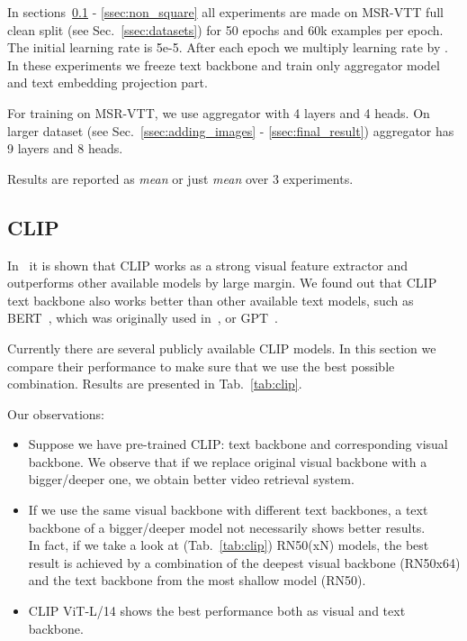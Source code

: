 In sections~\ref{ssec:clip} - \ref{ssec:non_square} all experiments are made on MSR-VTT full clean split (see Sec.~\ref{ssec:datasets}) for 50 epochs and 60k examples per epoch. The initial learning rate is 5e-5. After each epoch we multiply learning rate by . In these experiments we freeze text backbone and train only aggregator model and text embedding projection part. 

For training on MSR-VTT, we use aggregator with 4 layers and 4 heads. On larger dataset (see Sec.~\ref{ssec:adding_images} - \ref{ssec:final_result}) aggregator has 9 layers and 8 heads.

Results are reported as \textit{mean} or just \textit{mean} over 3 experiments.

\subsection{CLIP} \label{ssec:clip}
In~\cite{mdmmt} it is shown that CLIP works as a strong visual feature extractor and outperforms other available models by large margin. We found out that CLIP text backbone also works better than other available text models, such as BERT~\cite{bert}, which was originally used in~\cite{gabeur2020multimodal}, or GPT~\cite{gpt}.

Currently there are several publicly available CLIP models. In this section we compare their performance to make sure that we use the best possible combination. Results are presented in Tab.~\ref{tab:clip}.

Our observations:
\begin{itemize}
    \item Suppose we have pre-trained CLIP: text backbone and corresponding visual backbone. We observe that if we replace original visual backbone with
a bigger/deeper one, we obtain better video retrieval system.
    \item If we use the same visual backbone with different text backbones, a text backbone of a bigger/deeper model not necessarily shows better results. \\
    In fact, if we take a look at (Tab.~\ref{tab:clip}) RN50(xN) models, the best result is achieved by a combination of the deepest visual backbone (RN50x64) and the text backbone from the most shallow model (RN50).
    \item CLIP ViT-L/14 shows the best performance both as visual and text backbone.
    
\end{itemize}



